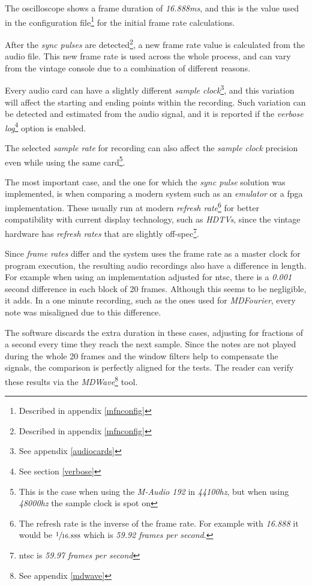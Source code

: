 \documentclass[10pt,a4paper]{report}
\newcommand{\fhz}[1]{\textit{#1\acrshort{hz}}}
\begin{document}
\begin{appendices}
The oscilloscope shows a frame duration of \textit{16.888\acrshort{ms}}, and this is the value used in the configuration file\footnote{Described in appendix \ref{mfnconfig}} for the initial frame rate calculations.

After the \textit{sync pulses} are detected\footnote{Described in appendix \ref{mfnconfig}}, a new frame rate value is calculated from the audio file. This new frame rate is used across the whole process, and can vary from the vintage console due to a combination of different reasons.

Every audio card can have a slightly different \textit{sample clock}\footnote{See appendix \ref{audiocards}}, and this variation will affect the starting and ending points within the recording. Such variation can be detected and estimated from the audio signal, and it is reported if the \textit{verbose log}\footnote{See section \ref{verbose}} option is enabled.

The selected \textit{sample rate} for recording can also affect the \textit{sample clock} precision even while using the same card\footnote{This is the case when using the \textit{M-Audio 192} \cite{maudio} in \fhz{44100}, but when using \fhz{48000} the sample clock is spot on}.

The most important case, and the one for which the \textit{sync pulse} solution was implemented, is when comparing a modern system such as an \textit{emulator} or a \acrshort{fpga} implementation. These usually run at modern \textit{refresh rate}\footnote{The refresh rate is the inverse of the frame rate. For example with \textit{16.888} it would be $\sfrac{1}{16.888}$ which is \textit{59.92 frames per second}.} for better compatibility with current display technology, such as \textit{HDTVs}, since the vintage hardware has \textit{refresh rates} that are slightly off-spec\footnote{\acrshort{ntsc} is \textit{59.97 frames per second}}.

Since \textit{frame rates} differ and the system uses the frame rate as a master clock for program execution, the resulting audio recordings also have a difference in length. For example when using an implementation adjusted for \acrshort{ntsc}, there is a \textit{0.001} second difference in each block of 20 frames. Although this seems to be negligible, it adds. In a one minute recording, such as the ones used for \textit{MDFourier}, every note was misaligned due to this difference.

The software discards the extra duration in these cases, adjusting for fractions of a second every time they reach the next sample. Since the notes are not played during the whole 20 frames and the window filters help to compensate the signals, the comparison is perfectly aligned for the tests. The reader can verify these results via the \textit{MDWave}\footnote{See appendix \ref{mdwave}} tool.


\end{appendices}
\end{document}
